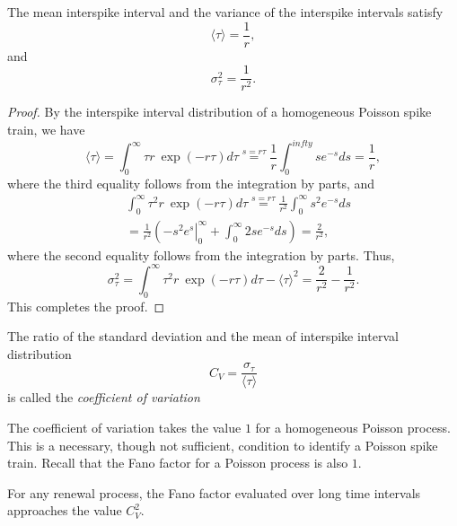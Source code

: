 \begin{thm}
  The mean interspike interval and the variance of the interspike intervals satisfy
  \begin{equation}
    \langle \tau \rangle = \frac{1}{r},
    \label{equ:1.32}         
  \end{equation}
  and
  \begin{equation}
    \sigma^2_\tau = \frac{1}{r^2}.
    \label{equ:1.33}         
  \end{equation}
\end{thm}
\begin{proof}
  By the interspike interval distribution of a homogeneous Poisson spike train, we have
  \begin{displaymath}
    \langle \tau \rangle =\int^{\infty}_{0}\tau r\ \exp(-r\tau)d\tau \overset{s = r\tau}{=} \frac{1}{r}\int_0^{infty}se^{-s}ds = \frac{1}{r},
  \end{displaymath}
  where the third equality follows from the integration by parts, and
  \begin{displaymath}
    \begin{aligned}
      &\int^{\infty}_{0}\tau^2 r\ \exp(-r\tau)d\tau \overset{s = r\tau}{=} \frac{1}{r^2}\int_0^{\infty}s^2e^{-s}ds\\
      &=\frac{1}{r^2}\left(\left.-s^2e^{s}\right|_0^{\infty}+\int_0^{\infty}2se^{-s}ds\right) = \frac{2}{r^2},
    \end{aligned}
  \end{displaymath}
  where the second equality follows from the integration by parts. Thus,
  \begin{displaymath}
    \sigma^2_\tau =\int^{\infty}_{0}\tau^2 r\ \exp(-r\tau)d\tau - \langle \tau \rangle^2 = \frac{2}{r^2} - \frac{1}{r^2}.
  \end{displaymath}
  This completes the proof.
\end{proof}\qedhere

\begin{defn}
    The ratio of the standard deviation and the mean of interspike interval distribution
    \begin{equation}
        C_V=\frac{\sigma_\tau}{\langle \tau  \rangle}
        \label{equ:1.34}
    \end{equation} is called the \emph{coefficient of variation}
\end{defn}

\begin{rem}
  The coefficient of variation takes the value $1$ for a homogeneous Poisson process. This is a necessary,  though not sufficient, condition to identify a Poisson spike train. Recall that the Fano factor for a Poisson process is also $1$.
\end{rem}
\begin{exc}
  For any renewal process, the Fano factor evaluated over long time intervals approaches the value $C^2_V$.
\end{exc}
  


